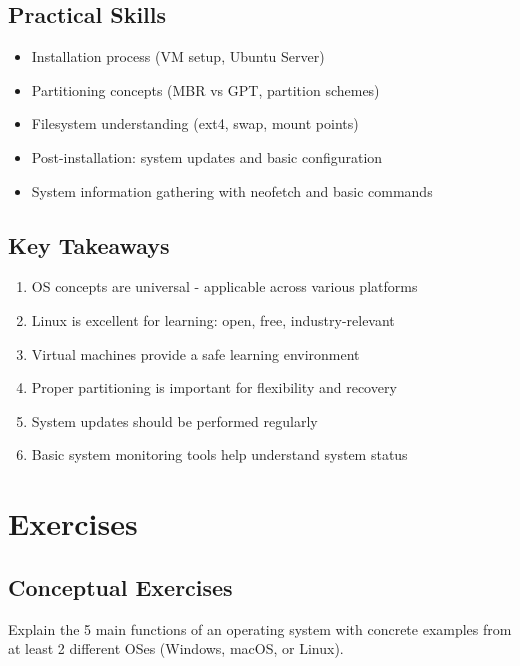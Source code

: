 \subsection{Practical Skills}

\begin{itemize}
    \item Installation process (VM setup, Ubuntu Server)
    \item Partitioning concepts (MBR vs GPT, partition schemes)
    \item Filesystem understanding (ext4, swap, mount points)
    \item Post-installation: system updates and basic configuration
    \item System information gathering with neofetch and basic commands
\end{itemize}

\subsection{Key Takeaways}

\begin{enumerate}
    \item OS concepts are universal - applicable across various platforms
    \item Linux is excellent for learning: open, free, industry-relevant
    \item Virtual machines provide a safe learning environment
    \item Proper partitioning is important for flexibility and recovery
    \item System updates should be performed regularly
    \item Basic system monitoring tools help understand system status
\end{enumerate}

\section{Exercises}
\label{sec:exercises}

\subsection{Conceptual Exercises}

\begin{exercisebox}[1.1]
Explain the 5 main functions of an operating system with concrete examples from at least 2 different OSes (Windows, macOS, or Linux).
\end{exercisebox}

